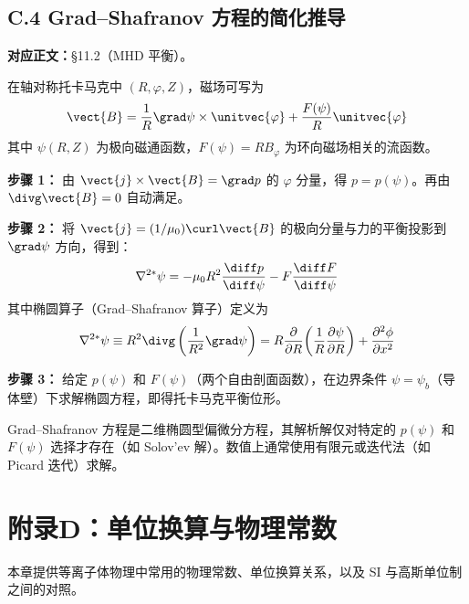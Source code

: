 \section{C.4 Grad--Shafranov 方程的简化推导}
\label{sec:grad-shafranov}

\textbf{对应正文：}\S 11.2（MHD 平衡）。

在轴对称托卡马克中 $(R,\varphi,Z)$，磁场可写为
\begin{equation}
\vect{B} = \frac{1}{R}\grad\psi\times\unitvec{\varphi} + \frac{F(\psi)}{R}\unitvec{\varphi}
\end{equation}
其中 $\psi(R,Z)$ 为极向磁通函数，$F(\psi)=RB_\varphi$ 为环向磁场相关的流函数。

\textbf{步骤 1：} 由 $\vect{j}\times\vect{B}=\grad p$ 的 $\varphi$ 分量，得 $p=p(\psi)$。再由 $\divg\vect{B}=0$ 自动满足。

\textbf{步骤 2：} 将 $\vect{j}=(1/\mu_0)\curl\vect{B}$ 的极向分量与力的平衡投影到 $\grad\psi$ 方向，得到：
\begin{equation}
\nabla^{2*}\psi = -\mu_0 R^2 \frac{\diff p}{\diff\psi} - F\frac{\diff F}{\diff\psi}
\end{equation}
其中椭圆算子（Grad--Shafranov 算子）定义为
\begin{equation}
\nabla^{2*}\psi \equiv R^2\divg\left(\frac{1}{R^2}\grad\psi\right) = R\frac{\partial }{\partial R}\!\left(\frac{1}{R}\frac{\partial \psi}{\partial R}\right) + \frac{\partial^2 \phi}{\partial x^2}
\end{equation}

\textbf{步骤 3：} 给定 $p(\psi)$ 和 $F(\psi)$（两个自由剖面函数），在边界条件 $\psi=\psi_b$（导体壁）下求解椭圆方程，即得托卡马克平衡位形。

\begin{tip}
Grad--Shafranov 方程是二维椭圆型偏微分方程，其解析解仅对特定的 $p(\psi)$ 和 $F(\psi)$ 选择才存在（如 Solov'ev 解）。数值上通常使用有限元或迭代法（如 Picard 迭代）求解。
\end{tip}


\chapter*{附录D：单位换算与物理常数}

本章提供等离子体物理中常用的物理常数、单位换算关系，以及 SI 与高斯单位制之间的对照。


